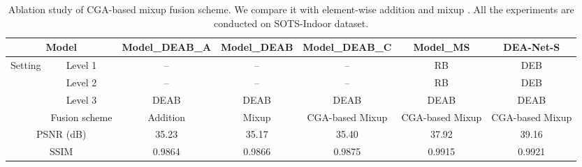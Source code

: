 \documentclass[lettersize,journal]{IEEEtran}
\begin{document}
\begin{table*}[p]
	\footnotesize
	\centering
	\caption{Ablation study of CGA-based mixup fusion scheme. We compare it with element-wise addition and mixup \cite{wu2021CVPR}. All the experiments are conducted on SOTS-Indoor \cite{li2018TIP} dataset.}
	\label{tab:table4}
	\begin{tabular}{c|c|ccc|cc}
		\toprule
		\multicolumn{2}{c|}{Model}         &  Model\_DEAB\_A & Model\_DEAB & Model\_DEAB\_C & Model\_MS & DEA-Net-S   \\ 
		\midrule \midrule
		\multirow{4}{*}{Setting} & Level 1 & --    & --    & -- & RB&DEB \\
		& Level 2 & --  & --  & -- &RB &DEB \\
		& Level 3 &DEAB & DEAB & DEAB & DEAB&DEAB \\
		&Fusion scheme & Addition & Mixup & CGA-based Mixup& CGA-based Mixup&CGA-based Mixup\\ 
		\midrule \midrule
		\multicolumn{2}{c|}{PSNR (dB)}     & 35.23  & 35.17  & 35.40 & 37.92 &39.16\\
		\multicolumn{2}{c|}{SSIM}          & 0.9864 & 0.9866  & 0.9875 & 0.9915&0.9921 \\
\bottomrule
	\end{tabular}
\end{table*}
\end{document}
